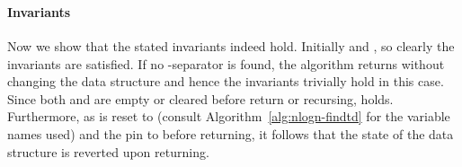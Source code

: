 \documentclass[a4paper,11pt]{article}
\theoremstyle{definition}
\theoremstyle{remark}
\begin{document}
\begin{algorithm}[h!]



\BlankLine
\Indp
  \\
  \\
  \\
  \\
  \\
  \\
  \While{}{
    \\
    
  }
  \\
  \\
  \\
  \\
  \For{}{
    \\
    \\
  }
  \\
  \For{}{
    \\
    \\
    \\
    
  }
  \\
  \\
  \\
  \KwRet 
  \caption{}
  \label{alg:nlogn-findtd}
\end{algorithm}

\paragraph{Invariants}
Now we show that the stated invariants indeed hold.  Initially  and , so clearly the invariants are
satisfied.  If no -separator is found, the algorithm returns
without changing the data structure and hence the invariants trivially
hold in this case.  Since both  and  are empty or cleared before
return or recursing,  holds.  Furthermore, as 
is reset to  (consult Algorithm~\ref{alg:nlogn-findtd} for the
variable names used) and the pin to  before returning, it
follows that the state of the data structure is reverted upon
returning.
\end{document}
